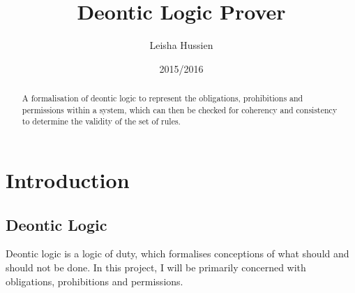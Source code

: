 \documentclass{l4proj}
\begin{document}
\title{Deontic Logic Prover}
\author{Leisha Hussien}
\date{2015/2016}
\maketitle

\begin{abstract}
A formalisation of deontic logic to represent the obligations, prohibitions and permissions within a system, which can then be checked for coherency and consistency to determine the validity of the set of rules.
\end{abstract}

\educationalconsent

\tableofcontents













\chapter{Introduction}

\section{Deontic Logic}
Deontic logic is a logic of duty, which formalises conceptions of what should and should not be done. In this project, I will be primarily concerned with obligations, prohibitions and permissions. 
\end{document}
